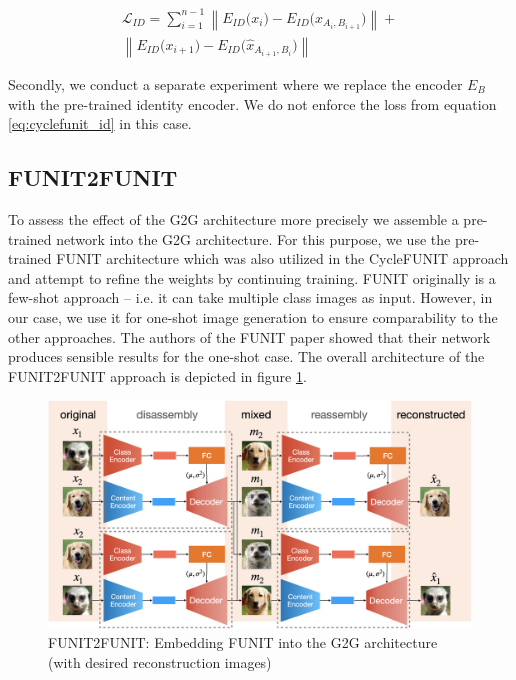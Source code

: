 \documentclass[conference]{IEEEtran}
\begin{document}
\begin{equation}
\begin{split}
	\mathcal{L}_{ID} = \sum_{i=1}^{n-1} \left\| E_{ID} \big( x_i \big) - E_{ID} \big(\hat{x}_{A_i, B_{i+1}} \big) \right\| + \\ \left\| E_{ID} \big( x_{i+1} \big) - E_{ID} \big(\hat{x}_{A_{i+1}, B_i} \big) \right\|
	\label{eq:cyclefunit_id}
\end{split}
\end{equation}

Secondly, we conduct a separate experiment where we replace the encoder $E_B$ with the pre-trained identity encoder. We do not enforce the loss from equation \ref{eq:cyclefunit_id} in this case. 

\subsection{FUNIT2FUNIT 
\label{chap4_methods_FUNIT2FUNIT}}
\label{sub:funit2funit}
To assess the effect of the G2G architecture more precisely we assemble a pre-trained network into the G2G architecture. For this purpose, we use the pre-trained FUNIT architecture which was also utilized in the CycleFUNIT approach and attempt to refine the weights by continuing training. FUNIT originally is a few-shot approach -- i.e. it can take multiple class images as input. However, in our case, we use it for one-shot image generation to ensure comparability to the other approaches. The authors of the FUNIT paper showed that their network produces sensible results for the one-shot case. The overall architecture of the FUNIT2FUNIT approach is depicted in figure \ref{fig:funit2funit}.

\begin{figure}
	\centering
	\includegraphics[width=\textwidth]{figures/funit2funit.png}
	\caption{FUNIT2FUNIT: Embedding FUNIT into the G2G architecture (with desired reconstruction images)}
	\label{fig:funit2funit}
\end{figure}
\end{document}
